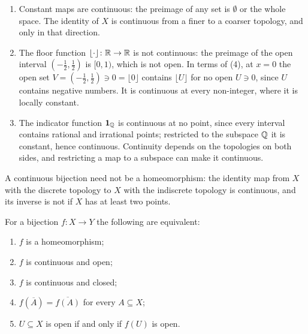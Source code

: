 \begin{example}\label{general-topology:example-continuity}
\begin{enumerate}
\item Constant maps are continuous: the preimage of any set is $\emptyset$ or the whole space. The identity of $X$ is continuous from a finer to a coarser topology, and only in that direction.
\item The floor function $\lfloor\cdot\rfloor \colon \mathbb{R} \to \mathbb{R}$ is not continuous: the preimage of the open interval $(-\frac12, \frac12)$ is $[0, 1)$, which is not open. In terms of (4), at $x = 0$ the open
set $V = (-\frac12, \frac12) \ni 0 = \lfloor0\rfloor$ contains $\lfloor U\rfloor$ for no open $U \ni 0$, since $U$ contains negative numbers. It is continuous at every non-integer, where it is locally
constant.
\item The indicator function $\mathbf{1}_{\mathbb{Q}}$ is continuous at no point, since every interval contains rational and irrational points; restricted to the subspace $\mathbb{Q}$ it is constant, hence continuous.
Continuity depends on the topologies on both sides, and restricting a map to a subspace can make it continuous.
\end{enumerate}
\end{example}

\begin{counterexample}\label{general-topology:counterexample-bijection-not-homeomorphism}
A continuous bijection need not be a homeomorphism: the identity map from $X$ with the discrete topology to $X$ with the
indiscrete topology is continuous, and its inverse is not if $X$ has at least two points.
\end{counterexample}

\begin{proposition}\label{general-topology:proposition-homeomorphism}
For a bijection $f \colon X \to Y$ the following are equivalent:
\begin{enumerate}
\item $f$ is a homeomorphism;
\item $f$ is continuous and open;
\item $f$ is continuous and closed;
\item $f(\overline{A}) = \overline{f(A)}$ for every $A \subseteq X$;
\item $U \subseteq X$ is open if and only if $f(U)$ is open.
\end{enumerate}
\end{proposition}

